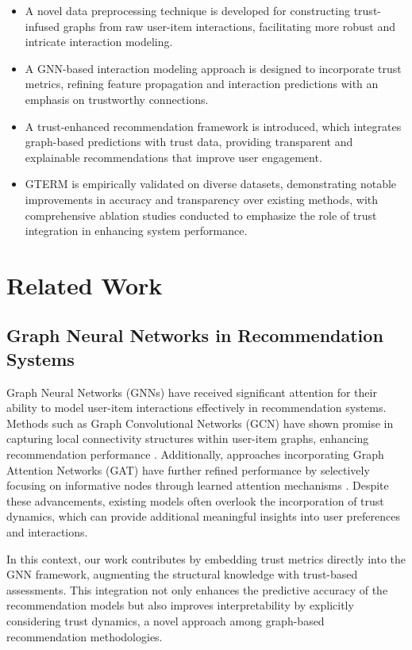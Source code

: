\documentclass{article} %
\begin{document}
\begin{itemize}
    \item A novel data preprocessing technique is developed for constructing trust-infused graphs from raw user-item interactions, facilitating more robust and intricate interaction modeling.
    \item A GNN-based interaction modeling approach is designed to incorporate trust metrics, refining feature propagation and interaction predictions with an emphasis on trustworthy connections.
    \item A trust-enhanced recommendation framework is introduced, which integrates graph-based predictions with trust data, providing transparent and explainable recommendations that improve user engagement.
    \item GTERM is empirically validated on diverse datasets, demonstrating notable improvements in accuracy and transparency over existing methods, with comprehensive ablation studies conducted to emphasize the role of trust integration in enhancing system performance.
\end{itemize}



\section{Related Work}

\subsection{Graph Neural Networks in Recommendation Systems}
Graph Neural Networks (GNNs) have received significant attention for their ability to model user-item interactions effectively in recommendation systems. Methods such as Graph Convolutional Networks (GCN) have shown promise in capturing local connectivity structures within user-item graphs, enhancing recommendation performance \citep{kipf2017semi, berg2018graph, wu2019neural}. Additionally, approaches incorporating Graph Attention Networks (GAT) have further refined performance by selectively focusing on informative nodes through learned attention mechanisms \citep{velickovic2018graph, wang2019inductive}. Despite these advancements, existing models often overlook the incorporation of trust dynamics, which can provide additional meaningful insights into user preferences and interactions.

In this context, our work contributes by embedding trust metrics directly into the GNN framework, augmenting the structural knowledge with trust-based assessments. This integration not only enhances the predictive accuracy of the recommendation models but also improves interpretability by explicitly considering trust dynamics, a novel approach among graph-based recommendation methodologies.
\end{document}
